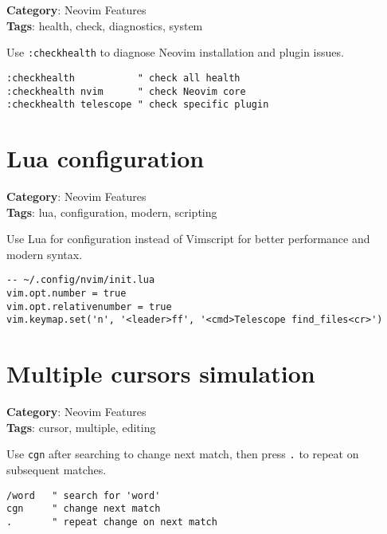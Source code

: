{{{{{{{{{{\textbf{Category}: Neovim Features\\ \textbf{Tags}: health, check, diagnostics, system
\vspace{0.5cm}

Use {\footnotesize \Verb§:checkhealth§} to diagnose Neovim installation and plugin issues.

\begin{Exa*}{}
\begin{Verbatim}[fontsize=\footnotesize, breaklines, breakanywhere]
:checkhealth           " check all health
:checkhealth nvim      " check Neovim core
:checkhealth telescope " check specific plugin
\end{Verbatim}
\end{Exa*}

\section{Lua configuration}

\textbf{Category}: Neovim Features\\ \textbf{Tags}: lua, configuration, modern, scripting
\vspace{0.5cm}

Use Lua for configuration instead of Vimscript for better performance and modern syntax.

\begin{Exa*}{}
\begin{Verbatim}[fontsize=\footnotesize, breaklines, breakanywhere]
-- ~/.config/nvim/init.lua
vim.opt.number = true
vim.opt.relativenumber = true
vim.keymap.set('n', '<leader>ff', '<cmd>Telescope find_files<cr>')
\end{Verbatim}
\end{Exa*}

\section{Multiple cursors simulation}

\textbf{Category}: Neovim Features\\ \textbf{Tags}: cursor, multiple, editing
\vspace{0.5cm}

Use {\footnotesize \Verb§cgn§} after searching to change next match, then press {\footnotesize \Verb§.§} to repeat on subsequent matches.

\begin{Exa*}{}
\begin{Verbatim}[fontsize=\footnotesize, breaklines, breakanywhere]
/word   " search for 'word'
cgn     " change next match
.       " repeat change on next match
\end{Verbatim}
\end{Exa*}

}}}}}}}}}}
